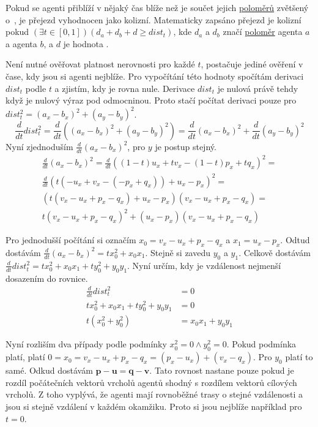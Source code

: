 Pokud se agenti přiblíží v nějaký čas blíže než je součet jejich \hyperref[par:polomer_agenta]{poloměrů}
zvětšený o~, je přejezd vyhodnocen jako kolizní.
Matematicky zapsáno přejezd je kolizní pokud $(\exists t\in[0, 1])(d_a + d_b + d \geq dist_t)$,
kde $d_a$ a $d_b$ značí \hyperref[par:polomer_agent]{poloměr} agenta $a$ a agenta $b$,
a $d$ je hodnota .

Není nutné ověřovat platnost nerovnosti pro každé $t$, postačuje jediné ověření v čase, kdy jsou si agenti nejblíže.
Pro vypočítání této hodnoty spočítám derivaci $dist_t$ podle $t$ a zjistím, kdy je rovna nule.
Derivace $dist_t$ je nulová právě tehdy když je nulový výraz pod odmocninou.
Proto stačí počítat derivaci pouze pro $dist^2_t = (a_x - b_x)^2 + (a_y - b_y)^2$.
\[
	\frac{d}{dt} dist^2_t =
	\frac{d}{dt} \left(\left(a_x - b_x\right)^2 + \left(a_y - b_y\right)^2\right) =
	\frac{d}{dt} \left(a_x - b_x\right)^2 + \frac{d}{dt} \left(a_y - b_y\right)^2
\]
Nyní zjednoduším $\frac{d}{dt} (a_x - b_x)^2$, pro $y$ je postup stejný.
\begin{gather*}
	\frac{d}{dt} \left(a_x - b_x\right)^2 =
	\frac{d}{dt} \left(\left(1-t\right)u_x + tv_x - \left(1-t\right)p_x + tq_x\right)^2 =  \\
	\frac{d}{dt} \left(t\left(-u_x + v_x -\left(-p_x + q_x\right)\right) + u_x - p_x\right)^2 =  \\
	\left(t\left(v_x - u_x + p_x - q_x\right) + u_x - p_x\right)\left(v_x - u_x + p_x - q_x\right) =  \\
	t\left(v_x - u_x + p_x - q_x\right)^2 + \left(u_x - p_x\right)\left(v_x - u_x + p_x - q_x\right)
\end{gather*}

Pro jednodušší počítání si označím $x_0 = v_x - u_x + p_x - q_x$ a $x_1 = u_x - p_x$.
Odtud dostávám $\frac{d}{dt} (a_x - b_x)^2 = tx^2_0 + x_0 x_1$.
Stejně si zavedu $y_0$ a $y_1$.
Celkově dostávám $\frac{d}{dt} dist^2_t = tx^2_0 + x_0 x_1 + ty^2_0 + y_0 y_1$.
Nyní určím, kdy je vzdálenost nejmenší dosazením do rovnice.
\begin{align*}
	\frac{d}{dt} dist^2_t &= 0 \\
	tx^2_0 + x_0 x_1 + ty^2_0 + y_0 y_1 &= 0 \\
	t\left(x^2_0 + y^2_0\right) &= x_0 x_1 + y_0 y_1
\end{align*}

Nyní rozliším dva případy podle podmínky $x^2_0 = 0 \wedge y^2_0 = 0$.
Pokud podmínka platí, platí $0 = x_0 = v_x - u_x + p_x - q_x = \left(p_x - u_x\right) + \left(v_x - q_x\right)$.
Pro $y_0$ platí to samé.
Odkud dostávám $\mathbf{p} - \mathbf{u} = \mathbf{q} - \mathbf{v}$.
Tato rovnost nastane pouze pokud je rozdíl počátečních vektorů vrcholů agentů shodný s rozdílem vektorů cílových vrcholů.
Z toho vyplývá, že agenti mají rovnoběžné trasy o stejné vzdálenosti a jsou si stejně vzdálení v každém okamžiku.
Proto si jsou nejblíže například pro $t = 0$.

